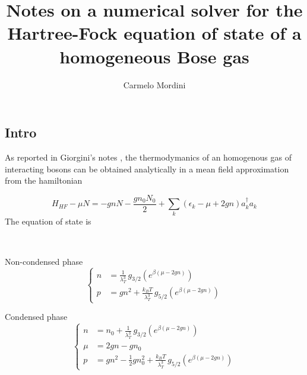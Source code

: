 \documentclass{article}
\title{Notes on a numerical solver for the Hartree-Fock equation of state of a homogeneous Bose gas}
\author{Carmelo Mordini}
\begin{document}
\maketitle

\subsection*{Intro}

As reported in Giorgini's notes \cite{giorgini}, the thermodymanics of an homogenous gas of interacting bosons can be obtained analytically in a mean field approximation from the hamiltonian

\begin{equation}
  H_{HF} - \mu N = -gnN - \frac{g n_0 N_0}{2} + \sum_{k} \left(\epsilon_k - \mu + 2gn\right)a^\dagger_k a_k
\end{equation}
The equation of state is

~\\


\begin{minipage}[t]{0.5\textwidth}
\centering
Non-condensed phase
\begin{equation}
  \left\{
  \begin{aligned}
    n &= \frac{1}{\lambda_T^3}\, g_{3/2}(e^{\beta(\mu - 2gn)}) \\
    p &= g n^2 + \frac{k_B T}{\lambda_T^3}\, g_{5/2}(e^{\beta(\mu - 2gn)})
  \end{aligned}\right.
\end{equation}

\end{minipage}%
\begin{minipage}[t]{0.5\textwidth}
\centering
Condensed phase
\begin{equation}
  \left\{
  \begin{aligned}
    n &= n_0 + \frac{1}{\lambda_T^3}\, g_{3/2}(e^{\beta(\mu - 2gn)}) \\
    \mu &= 2gn - gn_0 \\
    p &= g n^2 -\frac{1}{2}gn_0^2 + \frac{k_B T}{\lambda_T^3}\, g_{5/2}(e^{\beta(\mu - 2gn)})
  \end{aligned}\right.
\end{equation}
\end{minipage}
\end{document}
